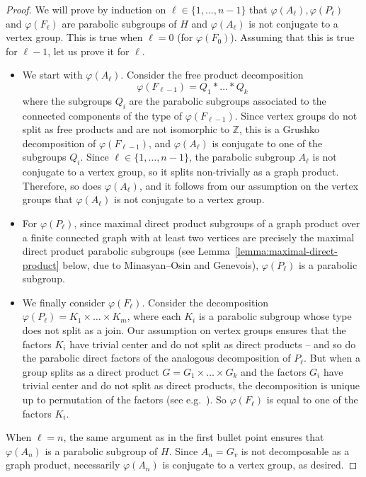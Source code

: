 \documentclass[a4paper,english,11pt]{article}
\theoremstyle{definition}
\theoremstyle{remark}
\begin{document}
\begin{proof}
We will prove by induction on $\ell\in \{1,\dots,n-1\}$ that $\varphi(A_\ell),\varphi(P_\ell)$ and $\varphi(F_\ell)$ are parabolic subgroups of $H$ and $\varphi(A_\ell)$ is not conjugate to a vertex group. This is true when $\ell=0$ (for $\varphi(F_0)$). Assuming that this is true for $\ell-1$, let us prove it for $\ell$. 
\begin{itemize}
\item We start with $\varphi(A_\ell)$. Consider the free product decomposition \[\varphi(F_{\ell-1})=Q_1\ast\dots\ast Q_k\]
where the subgroups $Q_i$ are the parabolic subgroups associated to the connected components of the type of $\varphi(F_{\ell-1})$. Since vertex groups do not split as free products and are not isomorphic to $\mathbb{Z}$, this is a Grushko decomposition of $\varphi(F_{\ell-1})$, and $\varphi(A_\ell)$ is conjugate to one of the subgroups $Q_i$. Since $\ell\in\{1,\dots,n-1\}$, the parabolic subgroup $A_\ell$ is not conjugate to a vertex group, so it splits non-trivially as a graph product. Therefore, so does $\varphi(A_\ell)$, and it follows from our assumption on the vertex groups that $\varphi(A_\ell)$ is not conjugate to a vertex group.
\item For $\varphi(P_\ell)$, since maximal direct product subgroups of a graph product over a finite connected graph with at least two vertices are precisely the maximal direct product parabolic subgroups (see Lemma~\ref{lemma:maximal-direct-product} below, due to Minasyan--Osin and Genevois), $\varphi(P_\ell)$ is a parabolic subgroup.
\item We finally consider $\varphi(F_\ell)$. Consider the decomposition $\varphi(P_\ell)=K_1\times\dots\times K_m$, where each $K_i$ is a parabolic subgroup whose type does not split as a join. Our assumption on vertex groups ensures that the factors $K_i$ have trivial center and do not split as direct products -- and so do the parabolic direct factors of the analogous decomposition of $P_\ell$. But when a group splits as a direct product $G=G_1\times\dots\times G_k$ and the factors $G_i$ have trivial center and do not split as direct products, the decomposition is unique up to permutation of the factors (see e.g.\ \cite[Lemma~3.5]{Fio}). So $\varphi(F_\ell)$ is equal to one of the factors $K_i$.
\end{itemize}
When $\ell=n$, the same argument as in the first bullet point ensures that $\varphi(A_n)$ is a parabolic subgroup of $H$. Since $A_n=G_v$ is not decomposable as a graph product, necessarily $\varphi(A_n)$ is conjugate to a vertex group, as desired.
\end{proof}
\end{document}
